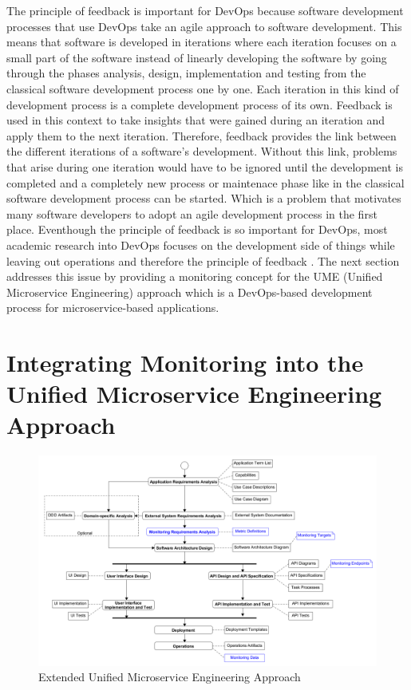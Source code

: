 The principle of feedback is important for DevOps
because software development processes that use DevOps take an agile approach to software development.
This means that software is developed in iterations where each iteration focuses on a small part of the software
instead of linearly developing the software by going through the phases analysis, design, implementation and testing
from the classical software development process one by one. Each iteration in this kind of development process
is a complete development process of its own. Feedback is used in this context to take insights that were gained
during an iteration and apply them to the next iteration. Therefore, feedback provides the link between the different
iterations of a software's development. Without this link, problems that arise during one iteration would have to be ignored
until the development is completed and a completely new process or maintenace phase like in the classical software
development process can be started. Which is a problem that motivates many software developers to adopt
an agile development process in the first place. Eventhough the principle of feedback is so important for DevOps,
most academic research into DevOps focuses on the development side of things while leaving out operations
and therefore the principle of feedback \cite{EG+16}. The next section addresses this issue by providing a monitoring concept
for the UME (Unified Microservice Engineering) approach which is a DevOps-based development process for microservice-based
applications.

\section{Integrating Monitoring into the Unified Microservice Engineering Approach}
\label{sec:integration_monitoring_ume}

\begin{figure}[tb]
	\centering
	\includegraphics[width=\textwidth]{figures/4.3_ume_approach_extended.png}
	\caption{Extended Unified Microservice Engineering Approach}
	\label{fig:ume_approach_extended}
\end{figure}

